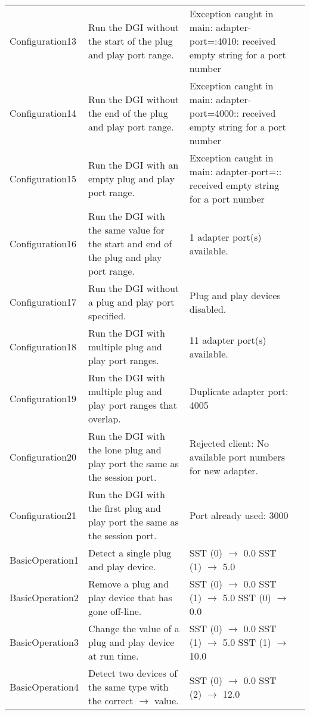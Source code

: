 \documentclass{article}
\begin{document}
\begin{center}
\begin{footnotesize}
\begin{longtable}{|p{3cm}|p{4cm}|p{10cm}|c|}
    Configuration13 & Run the DGI without the start of the plug and play port range. & Exception caught in main: adapter-port=:4010: received empty string for a port number & \\
    Configuration14 & Run the DGI without the end of the plug and play port range. & Exception caught in main: adapter-port=4000:: received empty string for a port number & \\
    Configuration15 & Run the DGI with an empty plug and play port range. & Exception caught in main: adapter-port=:: received empty string for a port number & \\
    Configuration16 & Run the DGI with the same value for the start and end of the plug and play port range. & 1 adapter port(s) available. & \\
    Configuration17 & Run the DGI without a plug and play port specified. & Plug and play devices disabled. & \\
    Configuration18 & Run the DGI with multiple plug and play port ranges. & 11 adapter port(s) available. & \\
    Configuration19 & Run the DGI with multiple plug and play port ranges that overlap. & Duplicate adapter port: 4005 & \\
    Configuration20 & Run the DGI with the lone plug and play port the same as the session port. & Rejected client: No available port numbers for new adapter. & \\
    Configuration21 & Run the DGI with the first plug and play port the same as the session port. & Port already used: 3000 & \\
    BasicOperation1 & Detect a single plug and play device. & SST (0) $\rightarrow$ 0.0 \newline SST (1) $\rightarrow$ 5.0 & \\
    BasicOperation2 & Remove a plug and play device that has gone off-line. & SST (0) $\rightarrow$ 0.0 \newline SST (1) $\rightarrow$ 5.0 \newline SST (0) $\rightarrow$ 0.0 & \\
    BasicOperation3 & Change the value of a plug and play device at run time. & SST (0) $\rightarrow$ 0.0 \newline SST (1) $\rightarrow$ 5.0 \newline SST (1) $\rightarrow$ 10.0 & \\
    BasicOperation4 & Detect two devices of the same type with the correct $\rightarrow$ value. & SST (0) $\rightarrow$ 0.0 \newline SST (2) $\rightarrow$ 12.0 & \\

\end{longtable}
\end{footnotesize}
\end{center}
\end{document}
